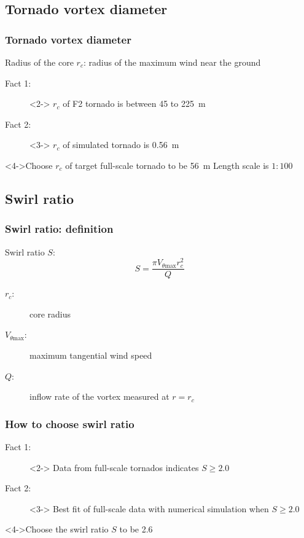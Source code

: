 \documentclass{beamer}
\begin{document}
\subsection{Tornado vortex diameter}

\begin{frame}
	\frametitle{Tornado vortex diameter}
	\begin{definition}
	 	\alert{Radius of the core $r_c$}: radius of the maximum wind near the ground
	\end{definition}
	\begin{description}
		\item[Fact 1: ]<2-> $r_c$ of F2 tornado is between \alert{\SI{45}{} to \SI{225}{m}}
		\item[Fact 2: ]<3-> $r_c$ of simulated tornado is \alert{\SI{0.56}{m}}
	\end{description}
	\begin{block}<4->{Choose $r_c$ of target full-scale tornado to be \alert{\SI{56}{m}}}
		   Length scale is $1:100$ 
	\end{block} 
\end{frame}

\subsection{Swirl ratio}

\begin{frame}
	\frametitle{Swirl ratio: definition}
	\begin{definition}
		\alert{Swirl ratio $S$}: 
		$$ S = \frac{\pi V_{\theta\mathrm{max}} r_c^2}{Q}$$
		\begin{description}
			\item[$r_c$: ] core radius
			\item[$V_{\theta\mathrm{max}}$: ] maximum tangential wind speed
			\item[$Q$: ] inflow rate of the vortex measured at $r=r_c$
		\end{description}
	\end{definition}
\end{frame}

\begin{frame}
	\frametitle{How to choose swirl ratio}
		\begin{description}
			\item[Fact 1: ] <2-> Data from full-scale tornados indicates \alert{$S\geqslant2.0$}
			\item[Fact 2: ]<3-> Best fit of full-scale data with numerical simulation when \alert{$S\geqslant2.0$}
		\end{description}
		\begin{block}<4->{Choose the swirl ratio $S$  to be \alert{\num{2.6}} }
			
		\end{block}
\end{frame}
\end{document}
